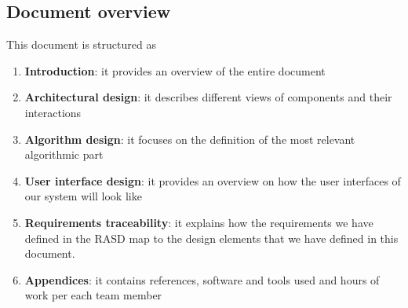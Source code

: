 \subsection{Document overview}
This document is structured as
\begin{enumerate}
	\item \textbf{Introduction}: it provides an overview of the entire document
	\item \textbf{Architectural design}: it describes different views of components and their interactions
	\item \textbf{Algorithm design}: it focuses on the definition of the most relevant algorithmic part
	\item \textbf{User interface design}: it provides an overview on how the user interfaces of our system will look like
	\item \textbf{Requirements traceability}: it explains how the requirements we have defined in the RASD map to the design elements that we have defined in this document.
	\item \textbf{Appendices}: it contains references, software and tools used and hours of work per each team member
\end{enumerate}